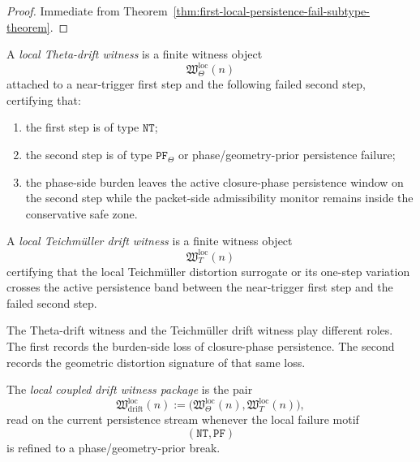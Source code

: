 \begin{proof}
Immediate from Theorem~\ref{thm:first-local-persistence-fail-subtype-theorem}.
\end{proof}


\begin{definition}
\label{def:local-theta-drift-witness}
A \emph{local Theta-drift witness} is a finite witness object
\[
\mathfrak{W}_{\Theta}^{\mathrm{loc}}(n)
\]
attached to a near-trigger first step and the following failed second step, certifying that:
\begin{enumerate}
    \item the first step is of type \(\mathtt{NT}\);
    \item the second step is of type \(\mathtt{PF}_{\Theta}\) or phase/geometry-prior persistence failure;
    \item the phase-side burden leaves the active closure-phase persistence window on the second step while the packet-side admissibility monitor remains inside the conservative safe zone.
\end{enumerate}
\end{definition}

\begin{definition}
\label{def:local-teichmueller-drift-witness}
A \emph{local Teichm\"uller drift witness} is a finite witness object
\[
\mathfrak{W}_{T}^{\mathrm{loc}}(n)
\]
certifying that the local Teichm\"uller distortion surrogate or its one-step variation crosses the active persistence band between the near-trigger first step and the failed second step.
\end{definition}

\begin{remark}
\label{rem:burden-side-versus-geometric-witness}
The Theta-drift witness and the Teichm\"uller drift witness play different roles.
The first records the burden-side loss of closure-phase persistence.
The second records the geometric distortion signature of that same loss.
\end{remark}

\begin{definition}
\label{def:local-coupled-drift-witness-package}
The \emph{local coupled drift witness package} is the pair
\[
\mathfrak{W}_{\mathrm{drift}}^{\mathrm{loc}}(n)
:=
\bigl(
\mathfrak{W}_{\Theta}^{\mathrm{loc}}(n),
\mathfrak{W}_{T}^{\mathrm{loc}}(n)
\bigr),
\]
read on the current persistence stream whenever the local failure motif
\[
(\mathtt{NT},\mathtt{PF})
\]
is refined to a phase/geometry-prior break.
\end{definition}

